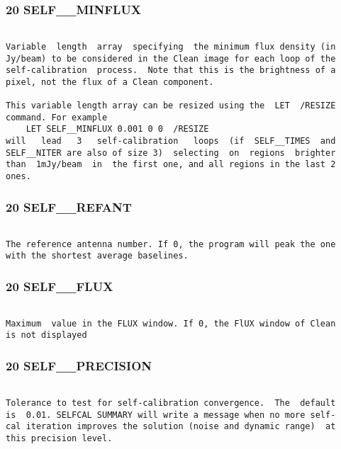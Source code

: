 \subsubsection{20 SELF\_\_MINFLUX}
\begin{verbatim}

Variable  length  array  specifying  the minimum flux density (in
Jy/beam) to be considered in the Clean image for each loop of the
self-calibration  process.  Note that this is the brightness of a
pixel, not the flux of a Clean component.

This variable length array can be resized using the  LET  /RESIZE
command. For example
    LET SELF__MINFLUX 0.001 0 0  /RESIZE
will   lead   3   self-calibration   loops  (if  SELF__TIMES  and
SELF__NITER are also of size 3)  selecting  on  regions  brighter
than  1mJy/beam  in  the first one, and all regions in the last 2
ones.

\end{verbatim}
\subsubsection{20 SELF\_\_REFANT}
\begin{verbatim}

The reference antenna number. If 0, the program will peak the one
with the shortest average baselines.

\end{verbatim}
\subsubsection{20 SELF\_\_FLUX}
\begin{verbatim}

Maximum  value in the FLUX window. If 0, the FlUX window of Clean
is not displayed

\end{verbatim}
\subsubsection{20 SELF\_\_PRECISION}
\begin{verbatim}

Tolerance to test for self-calibration convergence.  The  default
is  0.01. SELFCAL SUMMARY will write a message when no more self-
cal iteration improves the solution (noise and dynamic range)  at
this precision level.

\end{verbatim}
